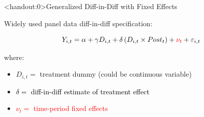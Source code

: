 \documentclass[10pt,xcolor=table,ignorenonframetext,aspectratio=169]{beamer}
\newlength{\wideitemsep}
\let\olditem\item
\renewcommand{\item}{\setlength{\itemsep}{\wideitemsep}\olditem}
\begin{document}

\begin{frame}<handout:0>{Generalized Diff-in-Diff with Fixed Effects}

\medskip
Widely used panel data diff-in-diff specification:  
\begin{small}
	\begin{equation*}
	Y_{i,t} = \alpha + \gamma D_{i,t} + \textcolor{black}{\delta} \left( D_{i,t} \times Post_t \right) + \textcolor{red}{\nu_t}  + \varepsilon_{i,t}
	\end{equation*}
\end{small}

\vspace{-0.32cm}

where:

\medskip
\begin{itemize}
	
	\item $D_{i,t} = $ treatment dummy (could be continuous variable)
	
	\item \textcolor{black}{$\delta = $ diff-in-diff estimate of treatment effect}
	
	\item \textcolor{red}{$\nu_t = $ time-period fixed effects}
	
	
\end{itemize}

\end{frame}



\end{document}
